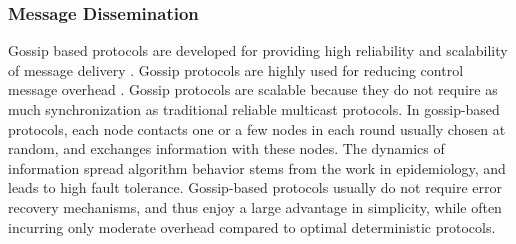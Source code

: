 
\subsubsection{Message Dissemination}

Gossip based protocols are developed for providing high reliability and scalability of message delivery \cite{islam2009efficient}. Gossip protocols are highly used for reducing control message overhead \cite{gupta2002fighting}. Gossip protocols are scalable because they do not require as much synchronization as traditional reliable multicast protocols. In gossip-based protocols, each node contacts one or a few nodes in each round usually chosen at random, and exchanges information with these nodes. The dynamics of information spread algorithm behavior stems from the work in epidemiology, and leads to high fault tolerance. Gossip-based protocols usually do not require error recovery mechanisms, and thus enjoy a large advantage in simplicity, while often incurring only moderate overhead compared to optimal deterministic protocols.

